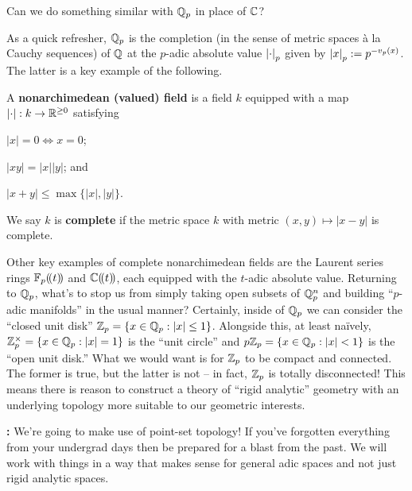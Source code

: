 \documentclass[11pt]{article}
\begin{document}
\begin{question}
Can we do something similar with $\mathbb{Q}_p$ in place of $\mathbb{C}$?
\end{question}

As a quick refresher, $\mathbb{Q}_p$ is the completion (in the sense of metric spaces \`{a} la Cauchy sequences) of $\mathbb{Q}$ at the $p$-adic absolute value $\left\lvert\cdot\right\rvert_p$ given by $\left\lvert x\right\rvert_p:=p^{-v_p(x)}$. The latter is a key example of the following.

\begin{definition}
A \textbf{nonarchimedean (valued) field} is a field $k$ equipped with a map $\left\lvert\cdot\right\rvert: k\to\mathbb{R}^{\geq0}$ satisfying 
\begin{enum}{\roman}
\item $|x|=0\iff x=0$;
\item $|xy|=|x||y|$; and
\item $|x+y|\leq\max\{|x|,|y|\}$.
\end{enum}
We say $k$ is \textbf{complete} if the metric space $k$ with metric $(x,y)\mapsto|x-y|$ is complete.
\end{definition}

Other key examples of complete nonarchimedean fields are the Laurent series rings $\mathbb{F}_p\!\left(\mkern-3mu\left(t\right)\mkern-3mu\right)$ and $\mathbb{C}\!\left(\mkern-3mu\left(t\right)\mkern-3mu\right)$, each equipped with the $t$-adic absolute value. Returning to $\mathbb{Q}_p$, what's to stop us from simply taking open subsets of $\mathbb{Q}_p^n$ and building ``$p$-adic manifolds'' in the usual manner? Certainly, inside of $\mathbb{Q}_p$ we can consider the ``closed unit disk'' $\mathbb{Z}_p=\{x\in\mathbb{Q}_p : |x|\leq1\}$. Alongside this, at least na\"{i}vely, $\mathbb{Z}_p^{\times}=\{x\in\mathbb{Q}_p : |x|=1\}$ is the ``unit circle'' and $p\mathbb{Z}_p=\{x\in\mathbb{Q}_p : |x|<1\}$ is the ``open unit disk.'' What we would want is for $\mathbb{Z}_p$ to be compact and connected. The former is true, but the latter is not -- in fact, $\mathbb{Z}_p$ is totally disconnected! This means there is reason to construct a theory of ``rigid analytic'' geometry with an underlying topology more suitable to our geometric interests.

\textbf{:} We're going to make use of point-set topology! If you've forgotten everything from your undergrad days then be prepared for a blast from the past. We will work with things in a way that makes sense for general adic spaces and not just rigid analytic spaces.
\end{document}

